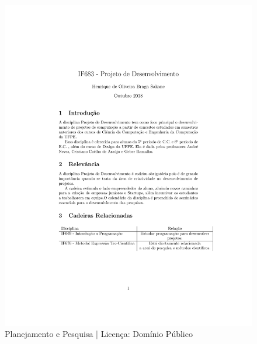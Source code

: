 \documentclass{article}
\begin{document}
\begin{figure}[h!]
\centering
\includegraphics[scale=1.0]{hobs}
\caption{Planejamento e Pesquisa | Licença: Domínio Público}
\label{fig:hobs}
\end{figure}



\cite{BlueOceanStrategy}
\cite{BusinessModelGeneration}
\cite{InnovationandEntrepreneurship}
\cite{TheLeanStartup}
\end{document}
